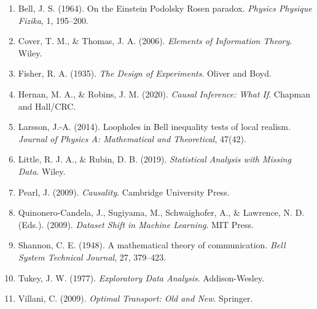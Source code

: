 \documentclass[11pt]{article}
\begin{document}
\begin{enumerate}
\item Bell, J. S. (1964). On the Einstein Podolsky Rosen paradox. \textit{Physics Physique Fizika}, 1, 195--200.

\item Cover, T. M., \& Thomas, J. A. (2006). \textit{Elements of Information Theory}. Wiley.

\item Fisher, R. A. (1935). \textit{The Design of Experiments}. Oliver and Boyd.

\item Hernan, M. A., \& Robins, J. M. (2020). \textit{Causal Inference: What If}. Chapman and Hall/CRC.

\item Larsson, J.-A. (2014). Loopholes in Bell inequality tests of local realism. \textit{Journal of Physics A: Mathematical and Theoretical}, 47(42).

\item Little, R. J. A., \& Rubin, D. B. (2019). \textit{Statistical Analysis with Missing Data}. Wiley.

\item Pearl, J. (2009). \textit{Causality}. Cambridge University Press.

\item Quinonero-Candela, J., Sugiyama, M., Schwaighofer, A., \& Lawrence, N. D. (Eds.). (2009). \textit{Dataset Shift in Machine Learning}. MIT Press.

\item Shannon, C. E. (1948). A mathematical theory of communication. \textit{Bell System Technical Journal}, 27, 379--423.

\item Tukey, J. W. (1977). \textit{Exploratory Data Analysis}. Addison-Wesley.

\item Villani, C. (2009). \textit{Optimal Transport: Old and New}. Springer.
\end{enumerate}
\end{document}
